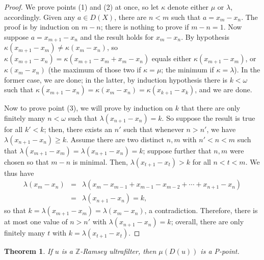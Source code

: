 \documentclass{amsart}
\newtheorem{theorem}{Theorem}[section]
\theoremstyle{definition}
\theoremstyle{remark}
\numberwithin{equation}{section}
\begin{document}
\begin{proof}
    We prove points (1) and (2) at once, so let $\kappa$ denote either $\mu$ or $\lambda$, accordingly. Given any $a\in D(X)$, there are $n<m$ such that $a=x_m-x_n$. The proof is by induction on $m-n$; there is nothing to prove if $m-n=1$. Now suppose $a=x_{m+1}-x_n$ and the result holds for $x_m-x_n$. By hypothesis $\kappa(x_{m+1}-x_m)\neq\kappa(x_m-x_n)$, so $\kappa(x_{m+1}-x_n)=\kappa(x_{m+1}-x_m+x_m-x_n)$ equals either $\kappa(x_{m+1}-x_m)$, or $\kappa(x_m-x_n)$ (the maximum of those two if $\kappa=\mu$; the minimum if $\kappa=\lambda$). In the former case, we are done; in the latter, by induction hypothesis there is $k<\omega$ such that $\kappa(x_{m+1}-x_n)=\kappa(x_m-x_n)=\kappa(x_{k+1}-x_k)$, and we are done.

    Now to prove point (3), we will prove by induction on $k$ that there are only finitely many $n<\omega$ such that $\lambda(x_{n+1}-x_n)=k$. So suppose the result is true for all $k'<k$; then, there exists an $n'$ such that whenever $n>n'$, we have $\lambda(x_{n+1}-x_n)\geq k$. Assume there are two distinct $n,m$ with $n'<n<m$ such that $\lambda(x_{m+1}-x_m)=\lambda(x_{n+1}-x_n)=k$; suppose further that $n,m$ were chosen so that $m-n$ is minimal. Then, $\lambda(x_{t+1}-x_t)>k$ for all $n<t<m$. We thus have
    \begin{eqnarray*}
        \lambda(x_m-x_n) & = & \lambda(x_m-x_{m-1}+x_{m-1}-x_{m-2}+\cdots+x_{n+1}-x_n) \\
        & = & \lambda(x_{n+1}-x_n)=k,
    \end{eqnarray*}
    so that $k=\lambda(x_{m+1}-x_m)=\lambda(x_m-x_n)$, a contradiction. Therefore, there is at most one value of $n>n'$ with $\lambda(x_{n+1}-x_n)=k$; overall, there are only finitely many $t$ with $k=\lambda(x_{t+1}-x_t)$.
\end{proof}

\begin{theorem}
If $u$ is a $\mathbb Z$-Ramsey ultrafilter, then $\mu(D(u))$ is a P-point.
\end{theorem}
\end{document}
